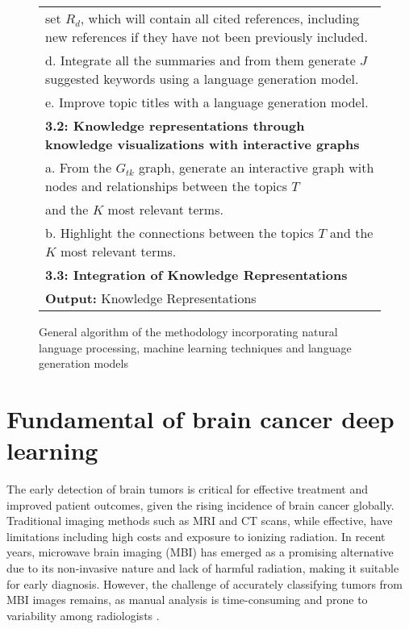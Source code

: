\documentclass[runningheads]{llncs}
\begin{document}
\begin{figure*}[!h]
{\begin{tabular}{l}
			\quad \quad \quad set $R_d$, which will contain all cited references, including new references if they have not been previously included.\\
			\quad \quad d. Integrate all the summaries and from them generate $J$ suggested keywords using a language generation model.\\
			\quad \quad e. Improve topic titles with a language generation model.\\
			\quad \textbf{3.2: Knowledge representations through knowledge visualizations with interactive graphs}\\
			\quad \quad a. From the $G_{tk}$ graph, generate an interactive graph with nodes and relationships between the topics $T$\\
			\quad \quad and the $K$ most relevant terms.\\
			\quad \quad b. Highlight the connections between the topics $T$ and the $K$ most relevant terms.\\
			\quad \textbf{3.3: Integration of Knowledge Representations}\\
			\hline
			\textbf{Output:} Knowledge Representations \\
			\hline
		\end{tabular}
	}
	\caption{\centering General algorithm of the methodology incorporating natural language processing, machine learning techniques and language generation models}
	\label{tab:Algorithm}
\end{figure*}

\FloatBarrier


\section{Fundamental of brain cancer deep learning}
The early detection of brain tumors is critical for effective treatment and improved patient outcomes, given the rising incidence of brain cancer globally. Traditional imaging methods such as MRI and CT scans, while effective, have limitations including high costs and exposure to ionizing radiation. In recent years, microwave brain imaging (MBI) has emerged as a promising alternative due to its non-invasive nature and lack of harmful radiation, making it suitable for early diagnosis. However, the challenge of accurately classifying tumors from MBI images remains, as manual analysis is time-consuming and prone to variability among radiologists \cite{Hossain_2024}.
\end{document}
